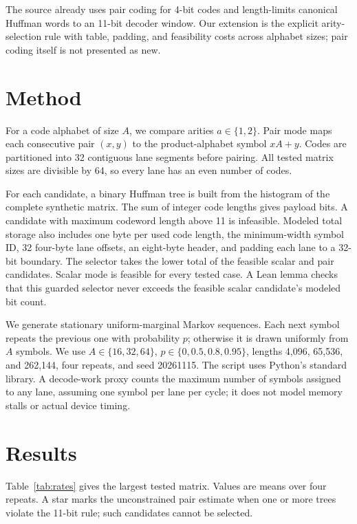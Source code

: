 \documentclass[11pt]{article}
\begin{document}
The source already uses pair coding for 4-bit codes and length-limits canonical Huffman words to an 11-bit decoder window. Our extension is the explicit arity-selection rule with table, padding, and feasibility costs across alphabet sizes; pair coding itself is not presented as new.

\section{Method}
For a code alphabet of size $A$, we compare arities $a\in\{1,2\}$. Pair mode maps each consecutive pair $(x,y)$ to the product-alphabet symbol $xA+y$. Codes are partitioned into 32 contiguous lane segments before pairing. All tested matrix sizes are divisible by 64, so every lane has an even number of codes.

For each candidate, a binary Huffman tree is built from the histogram of the complete synthetic matrix. The sum of integer code lengths gives payload bits. A candidate with maximum codeword length above 11 is infeasible. Modeled total storage also includes one byte per used code length, the minimum-width symbol ID, 32 four-byte lane offsets, an eight-byte header, and padding each lane to a 32-bit boundary. The selector takes the lower total of the feasible scalar and pair candidates. Scalar mode is feasible for every tested case. A Lean lemma checks that this guarded selector never exceeds the feasible scalar candidate's modeled bit count.

We generate stationary uniform-marginal Markov sequences. Each next symbol repeats the previous one with probability $p$; otherwise it is drawn uniformly from $A$ symbols. We use $A\in\{16,32,64\}$, $p\in\{0,0.5,0.8,0.95\}$, lengths 4,096, 65,536, and 262,144, four repeats, and seed 20261115. The script uses Python's standard library. A decode-work proxy counts the maximum number of symbols assigned to any lane, assuming one symbol per lane per cycle; it does not model memory stalls or actual device timing.

\section{Results}
Table~\ref{tab:rates} gives the largest tested matrix. Values are means over four repeats. A star marks the unconstrained pair estimate when one or more trees violate the 11-bit rule; such candidates cannot be selected.
\end{document}

